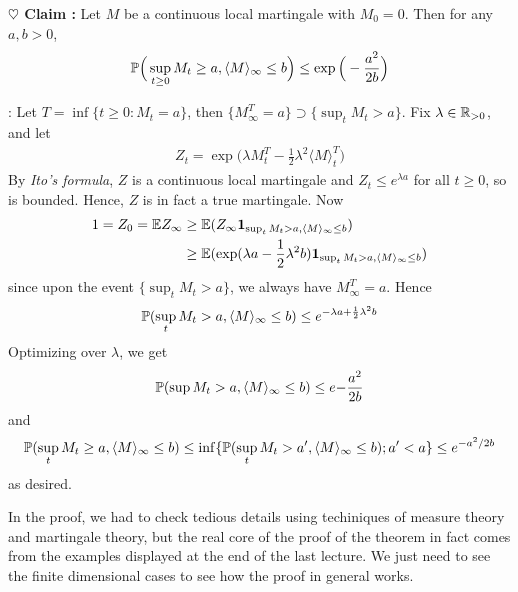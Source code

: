 \documentclass[10pt,a4paper]{article}
\newenvironment{proof}
{\begin{changemargin}{0.5cm}{0.5cm} 
	}%
	{\end{changemargin}
}
\newenvironment{subproof}
{\begin{changemargin}{0.5cm}{0.5cm} 
	}%
	{\end{changemargin}
}
\newenvironment{p}
{\begin{proof} 
	}%
	{\end{proof}
}
\begin{document}
\begin{p}
\textbf{$\heartsuit$ Claim :} Let $M$ be a continuous local martingale with $M_0 =0$. Then for any $a,b>0$,
\begin{align*}
\mathbb{P}\Big( \sup_{t\geq 0} M_t \geq a, \langle M\rangle_{\infty} \leq b\Big) \leq \exp \Big( -\frac{a^2}{2b} \Big)
\end{align*}
\begin{subproof}
: Let $T=\inf \{t\geq 0 : M_t =a \}$, then $\{M_{\infty}^{T} =a \} \supset \{ \sup_t M_t >a\}$. Fix $\lambda \in \mathbb{R}_{>0}$, and let
\begin{align*}
Z_t = \exp \Big( \lambda M_t^T -\frac{1}{2} \lambda^2 \langle M \rangle_t^T \Big)
\end{align*}
By \emph{Ito's formula}, $Z$ is a continuous local martingale and $Z_t \leq e^{\lambda a}$ for all $t\geq 0$, so is bounded. Hence, $Z$ is in fact a true martingale. Now
\begin{align*}
1 = Z_0 = \mathbb{E} Z_{\infty} &\geq \mathbb{E}(Z_{\infty} \bm{1}_{\sup_{t} M_t >a, \langle M \rangle_{\infty} \leq b}) \\
&\geq \mathbb{E} (\exp (\lambda a -\frac{1}{2} \lambda^2 b) \bm{1}_{\sup_{t} M_t >a, \langle M \rangle_{\infty} \leq b})
\end{align*}
since upon the event $\{\sup_{t} M_t >a\}$, we always have $M_{\infty}^T =a$. Hence
\begin{align*}
\mathbb{P} (\sup_t M_t >a, \langle M \rangle_{\infty} \leq b) \leq e^{-\lambda a + \frac{1}{2} \lambda^2 b}
\end{align*} 
Optimizing over $\lambda$, we get
\begin{align*}
\mathbb{P} (\sup M_t >a, \langle M \rangle_{\infty} \leq b) \leq e{-\frac{a^2}{2b}}
\end{align*}
and
\begin{align*}
\mathbb{P}(\sup_t M_t \geq a, \langle M \rangle_{\infty} \leq b) \leq \inf \{ \mathbb{P}(\sup_t M_t >a', \langle M\rangle_{\infty} \leq b) ; a'<a \} \leq e^{-a^2 /2b}
\end{align*}
as desired.
\end{subproof}
\eop 
\end{p}
\s

In the proof, we had to check tedious details using techiniques of measure theory and martingale theory, but the real core of the proof of the theorem in fact comes from the examples displayed at the end of the last lecture. We just need to see the finite dimensional cases to see how the proof in general works. 
\s

\newday
\end{document}

